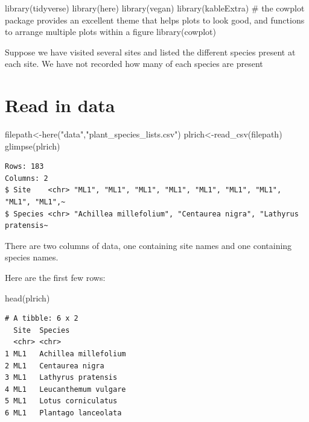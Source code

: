 \documentclass[
  letterpaper,
  DIV=11,
  numbers=noendperiod]{scrreprt}
\newenvironment{Shaded}{\begin{snugshade}}{\end{snugshade}}
\newcommand{\CommentTok}[1]{\textcolor[rgb]{0.37,0.37,0.37}{#1}}
\newcommand{\FunctionTok}[1]{\textcolor[rgb]{0.28,0.35,0.67}{#1}}
\newcommand{\NormalTok}[1]{\textcolor[rgb]{0.00,0.23,0.31}{#1}}
\newcommand{\OtherTok}[1]{\textcolor[rgb]{0.00,0.23,0.31}{#1}}
\newcommand{\StringTok}[1]{\textcolor[rgb]{0.13,0.47,0.30}{#1}}
\begin{document}
\begin{Shaded}
\begin{Highlighting}[]
\FunctionTok{library}\NormalTok{(tidyverse)}
\FunctionTok{library}\NormalTok{(here)}
\FunctionTok{library}\NormalTok{(vegan)}
\FunctionTok{library}\NormalTok{(kableExtra)}
\CommentTok{\# the cowplot package provides an excellent theme that helps plots to look good, and functions to arrange multiple plots within a figure}
\FunctionTok{library}\NormalTok{(cowplot) }
\end{Highlighting}
\end{Shaded}

Suppose we have visited several sites and listed the different species
present at each site. We have not recorded how many of each species are
present

\section{Read in data}\label{read-in-data}

\begin{Shaded}
\begin{Highlighting}[]
\NormalTok{filepath}\OtherTok{\textless{}{-}}\FunctionTok{here}\NormalTok{(}\StringTok{"data"}\NormalTok{,}\StringTok{"plant\_species\_lists.csv"}\NormalTok{)}
\NormalTok{plrich}\OtherTok{\textless{}{-}}\FunctionTok{read\_csv}\NormalTok{(filepath)}
\FunctionTok{glimpse}\NormalTok{(plrich)}
\end{Highlighting}
\end{Shaded}

\begin{verbatim}
Rows: 183
Columns: 2
$ Site    <chr> "ML1", "ML1", "ML1", "ML1", "ML1", "ML1", "ML1", "ML1", "ML1",~
$ Species <chr> "Achillea millefolium", "Centaurea nigra", "Lathyrus pratensis~
\end{verbatim}

There are two columns of data, one containing site names and one
containing species names.

Here are the first few rows:

\begin{Shaded}
\begin{Highlighting}[]
\FunctionTok{head}\NormalTok{(plrich)}
\end{Highlighting}
\end{Shaded}

\begin{verbatim}
# A tibble: 6 x 2
  Site  Species             
  <chr> <chr>               
1 ML1   Achillea millefolium
2 ML1   Centaurea nigra     
3 ML1   Lathyrus pratensis  
4 ML1   Leucanthemum vulgare
5 ML1   Lotus corniculatus  
6 ML1   Plantago lanceolata 
\end{verbatim}
\end{document}
